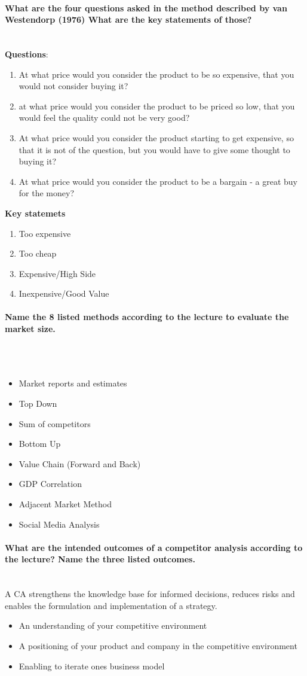 \documentclass[10pt,a4paper,noendnumber=true]{scrartcl}
\newcommand{\properparagraph}[1]{\paragraph{\textcolor{Emerald}{#1}}\mbox{}\\}
\begin{document}
\properparagraph{What are the four questions asked in the method described by van Westendorp (1976) What are the key statements of those?}
\textbf{Questions}:
\begin{enumerate}
	\item At what price would you consider the product to be so expensive, that you would not consider buying it?
	\item at what price would you consider the product to be priced so low, that you would feel the quality could not be very good?
	\item At what price would you consider the product starting to get expensive, so that it is not of the question, but you would have to give some thought  to buying it?
	\item At what price would you consider the product to be a bargain - a great buy for the money?
\end{enumerate}
\textbf{Key statemets}
\begin{enumerate}
	\item Too expensive
	\item Too cheap
	\item Expensive/High Side
	\item Inexpensive/Good Value
\end{enumerate}

\properparagraph{Name the 8 listed methods according to the lecture to evaluate the market size.}
\\[-6ex]
\begin{itemize}
	\item Market reports and estimates
	\item Top Down
	\item Sum of competitors
	\item Bottom Up
	\item Value Chain (Forward and Back)
	\item GDP Correlation
	\item Adjacent Market Method
	\item Social Media Analysis
\end{itemize}

\properparagraph{What are the intended outcomes of a competitor analysis according to the lecture? Name the three listed outcomes.}
A CA strengthens the knowledge base for informed decisions, reduces risks and enables the formulation and implementation of a strategy.
\begin{itemize}
	\item An understanding of your competitive environment
	\item A positioning of your product and company in the competitive environment
	\item Enabling to iterate ones business model
\end{itemize}
\end{document}
